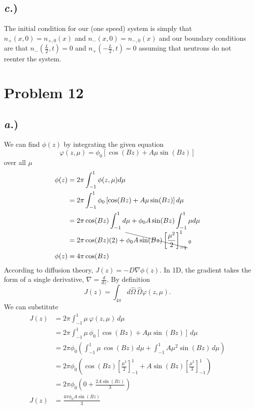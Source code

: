 \documentclass{article}
\newcommand{\Oh}{\hat{\Omega}}
\begin{document}
\subsection*{\textit{c.})}
The initial condition for our (one speed) system is simply that $n_+(x,0)=n_{+,0}(x)$ and $n_-(x,0)=n_{-,0}(x)$ and our boundary conditions are that $n_-(\frac{L}{2},t)=0$ and $n_+(-\frac{L}{2},t)=0$ assuming that neutrons do not reenter the system. 




\section*{Problem 12}

\subsection*{\textit{a.})}

We can find $\phi(z)$ by integrating the given equation 
$$ \varphi(z,\mu) = \phi_0 \left[\cos(Bz) + A \mu \sin(Bz)\right] $$
over all $\mu$
\begin{align*}
\phi(z)	&= 2\pi \int_{-1}^{1} \phi(z,\mu) d\mu \\
		&= 2\pi \int_{-1}^{1} \phi_0\left[\cos(Bz) + A \mu \sin(Bz)\right] d\mu \\
		&= 2\pi \cos(Bz) \int_{-1}^{1} d\mu + \phi_0 A \sin(Bz) \int_{-1}^{1} \mu d\mu\\
		&= 2\pi \cos(Bz) (2) + \bcancel{\phi_0 A \sin(Bz) \left[ \frac{\mu^2}{2} \right]_{-1}^{1}}_{\;0}\\
\phi(z)	&= 4\pi \cos(Bz)
\end{align*}
According to diffusion theory, $J(z) = -D \nabla \phi(z)$. In 1D, the gradient takes the form of a single derivative, $\nabla = \frac{d}{dz}$. By definition 
$$ J(z) = \int_{4\pi} d\Oh \, \Oh \varphi(z,\mu).$$
We can substitute 
\begin{align*}
J(z)	&= 2\pi \int_{-1}^{1} \mu \, \varphi(z,\mu) \, d\mu \\
		&= 2\pi \int_{-1}^{1} \mu \, \phi_0 \left[\cos(Bz) + A \mu \sin(Bz)\right] \, d\mu \\
		&= 2\pi\phi_0 \left( \int_{-1}^{1} \mu \, \cos(Bz) \, d\mu + \int_{-1}^{1} A \mu^2 \sin(Bz) \, d\mu \right) \\
		&= 2\pi\phi_0 \left( \cos(Bz) \left[\frac{\mu^2}{2} \right]_{-1}^{1} + A \sin(Bz) \left[ \frac{\mu^3}{3} \right]_{-1}^{1} \right) \\
		&= 2\pi\phi_0 \left( 0 + \frac{2A\sin(Bz)}{3} \right) \\
J(z)	&= \frac{4\pi\phi_0A\sin(Bz)}{3}
\end{align*}
\end{document}
